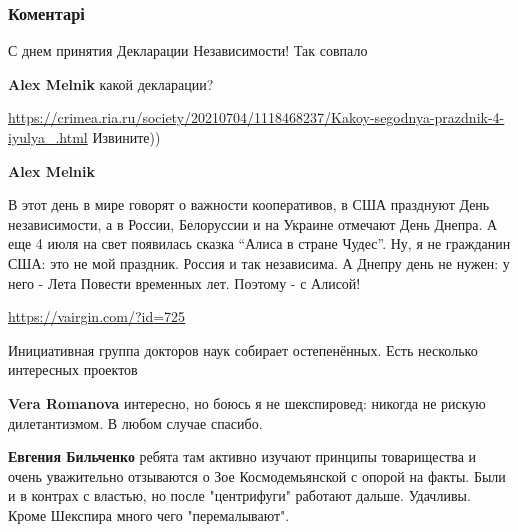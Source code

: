  
 
 
 
 
\subsubsection{Коментарі}
\label{sec:04_07_2021.fb.bilchenko_evgenia.3.down_house.cmt}

\begin{itemize}
С днем принятия Декларации Независимости!
Так совпало

\textbf{Alex Melnik} какой декларации?

\url{https://crimea.ria.ru/society/20210704/1118468237/Kakoy-segodnya-prazdnik-4-iyulya_.html}
Извините))

\textbf{Alex Melnik} 

В этот день в мире говорят о важности кооперативов, в США празднуют День
независимости, а в России, Белоруссии и на Украине отмечают День Днепра. А еще
4 июля на свет появилась сказка \enquote{Алиса в стране Чудес}. Ну, я не гражданин США:
это не мой праздник. Россия и так независима. А Днепру день не нужен: у него -
Лета Повести временных лет. Поэтому - с Алисой!

\url{https://vairgin.com/?id=725}\par
Инициативная группа докторов наук собирает остепенённых. Есть несколько интересных проектов

\textbf{Vera Romanova} интересно, но боюсь я не шекспировед: никогда не рискую дилетантизмом. В любом случае спасибо.

\textbf{Евгения Бильченко} ребята там активно изучают принципы товарищества и очень уважительно отзываются о Зое Космодемьянской с опорой на факты. Были и в контрах с властью, но после "центрифуги" работают дальше. Удачливы. Кроме Шекспира много чего "перемалывают".


\end{itemize}
